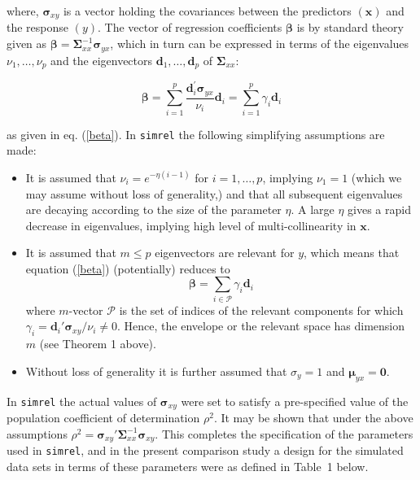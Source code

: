 \documentclass[a4paper, 11pt]{article}
\begin{document}
where, $\boldsymbol{\sigma}_{xy}$ is a vector holding the covariances between the predictors $(\mathbf{x})$ and the response $(y)$. The vector of regression coefficients  $\boldsymbol{\beta}$ is by standard theory given as $\boldsymbol{\beta} = \boldsymbol{\Sigma}_{xx}^{-1}\boldsymbol{\sigma}_{yx}$, which in turn can be expressed in terms of the eigenvalues $\nu_1, \ldots, \nu_p$ and the eigenvectors $\bm{d}_1, \ldots, \bm{d}_p$ of $\boldsymbol{\Sigma}_{xx}$:

\begin{equation}
\boldsymbol{\beta} = \sum_{i=1}^p \frac{\boldsymbol{d}_i^{'}\boldsymbol{\sigma}_{yx}}{\nu_i}\boldsymbol{d}_i = \sum_{i=1}^p\gamma_i \boldsymbol{d}_i
\end{equation} 

as given in eq. (\ref{beta}). In {\tt simrel} the following simplifying assumptions are made: 

\begin{itemize}[label=$\triangleright$]
\item It is assumed that $\nu_{i} = e^{-\eta(i-1)}$ for $i=1, \ldots, p$, implying $\nu_1=1$ (which we may assume without loss of generality,) and that all subsequent eigenvalues are decaying according to the size of the parameter $\eta$.  A large $\eta$ gives a rapid decrease in eigenvalues, implying high level of multi-collinearity in $\boldsymbol{x}$.
\item It is assumed that $m \le p$ eigenvectors are relevant for $y$, which means that equation (\ref{beta}) (potentially) reduces to
 \begin{equation}
   \label{eq:relevant-beta}
   \bm{\beta} = \sum_{i \in \mathcal{P}}{\gamma_i \bm{d}_i}
 \end{equation}
 where $m$-vector $\mathcal{P}$ is the set of indices of the relevant components for which $\gamma_i = \bm{d}_i' \bm{\sigma}_{xy}/\nu_i \ne 0$. Hence, the envelope or the relevant space has dimension $m$ (see Theorem 1 above).
\item Without loss of generality it is further assumed that $\sigma_y=1$ and $\boldsymbol{\mu}_{yx}=\boldsymbol{0}$.
\end{itemize}

In {\tt simrel} the actual values of $\boldsymbol{\sigma}_{xy}$ were set to satisfy a pre-specified value of the population coefficient of determination $\rho^2$. It may be shown that under the above assumptions $\rho^2=\boldsymbol{\sigma}_{xy}'\boldsymbol{\Sigma}_{xx}^{-1}\boldsymbol{\sigma}_{xy}$. This completes the specification of the parameters used in {\tt simrel}, and in the present comparison study a design for the simulated data sets in terms of these parameters were as defined in Table~1 below.
\end{document}
